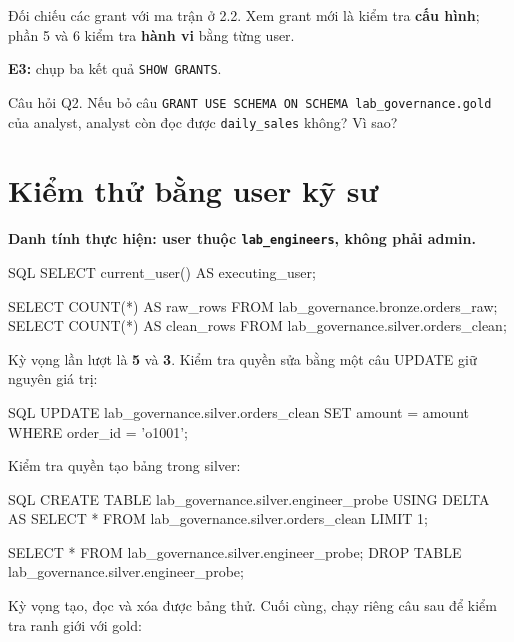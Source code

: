 Đối chiếu các grant với ma trận ở 2.2. Xem grant mới là kiểm tra \textbf{cấu hình}; phần 5 và 6 kiểm tra \textbf{hành vi} bằng từng user.


\begin{evidencebox}
\textbf{E3:} chụp ba kết quả \texttt{SHOW GRANTS}.
\end{evidencebox}

\begin{questionbox}{Câu hỏi Q2.}
Nếu bỏ câu \texttt{GRANT USE SCHEMA ON SCHEMA lab\_\allowbreak{}governance.\allowbreak{}gold} của analyst, analyst còn đọc được \texttt{daily\_\allowbreak{}sales} không? Vì sao?
\end{questionbox}

\section{Kiểm thử bằng user kỹ sư}

\textbf{Danh tính thực hiện: user thuộc \texttt{lab\_\allowbreak{}engineers}, không phải admin.}\par\nopagebreak

\begin{aivncodebox}[language={}]{SQL}
SELECT current_user() AS executing_user;

SELECT COUNT(*) AS raw_rows FROM lab_governance.bronze.orders_raw;
SELECT COUNT(*) AS clean_rows FROM lab_governance.silver.orders_clean;
\end{aivncodebox}

Kỳ vọng lần lượt là \textbf{5} và \textbf{3}. Kiểm tra quyền sửa bằng một câu UPDATE giữ nguyên giá trị:


\begin{aivncodebox}[language={}]{SQL}
UPDATE lab_governance.silver.orders_clean
SET amount = amount
WHERE order_id = 'o1001';
\end{aivncodebox}

Kiểm tra quyền tạo bảng trong silver:


\begin{aivncodebox}[language={}]{SQL}
CREATE TABLE lab_governance.silver.engineer_probe
USING DELTA AS
SELECT * FROM lab_governance.silver.orders_clean LIMIT 1;

SELECT * FROM lab_governance.silver.engineer_probe;
DROP TABLE lab_governance.silver.engineer_probe;
\end{aivncodebox}

Kỳ vọng tạo, đọc và xóa được bảng thử. Cuối cùng, chạy riêng câu sau để kiểm tra ranh giới với gold:


